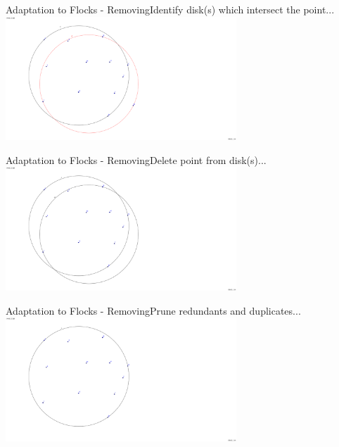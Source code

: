\documentclass{beamer}
\begin{document}
\begin{frame}{Adaptation to Flocks - Removing}{Identify disk(s) which intersect the point...}
    \centering
    \includegraphics[trim=2cm 0 8cm 0,clip,width=0.65\textwidth]{figures/G01b} 
\end{frame}
\begin{frame}{Adaptation to Flocks - Removing}{Delete point from disk(s)...}
    \centering
    \includegraphics[trim=2cm 0 8cm 0,clip,width=0.65\textwidth]{figures/G02} 
\end{frame}
\begin{frame}{Adaptation to Flocks - Removing}{Prune redundants and duplicates...}
    \centering
    \includegraphics[trim=2cm 0 8cm 0,clip,width=0.65\textwidth]{figures/G03} 
\end{frame}
\end{document}
